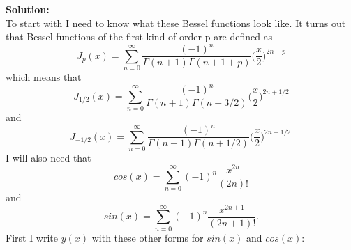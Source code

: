 \documentclass[a4paper,12pt]{article}
\begin{document}
\textbf{Solution:}\\
To start with I need to know what these Bessel functions look like. It turns out that Bessel functions of the first kind of order p are defined as 
\begin{equation}
J_p(x) = \sum_{n=0}^{\infty}\frac{(-1)^n}{\Gamma(n+1)\Gamma(n+1+p)}\bigg(\frac{x}{2}\bigg)^{2n+p}
\end{equation}
which means that
\begin{equation}
J_{1/2}(x) = \sum_{n=0}^{\infty}\frac{(-1)^n}{\Gamma(n+1)\Gamma(n+3/2)}\bigg(\frac{x}{2}\bigg)^{2n+1/2}
\end{equation}
and 
\begin{equation}
J_{-1/2}(x) = \sum_{n=0}^{\infty}\frac{(-1)^n}{\Gamma(n+1)\Gamma(n+1/2)}\bigg(\frac{x}{2}\bigg)^{2n-1/2.}
\end{equation}
I will also need that 
\begin{equation}
cos(x) = \sum_{n=0}^{\infty}(-1)^n\frac{x^{2n}}{(2n)!}
\end{equation}
and 
\begin{equation}
sin(x)= \sum_{n=0}^{\infty}(-1)^n\frac{x^{2n+1}}{(2n+1)!}.
\end{equation}
First I write $y(x)$ with these other forms for $sin(x)$ and $cos(x)$:
\end{document}
